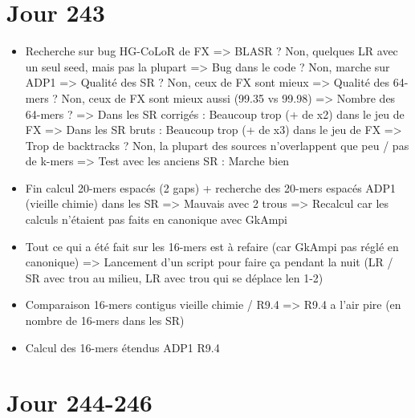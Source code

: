 \documentclass[12pt]{report}
\begin{document}
\section{Jour 243}

\begin{itemize}
	\item Recherche sur bug HG-CoLoR de FX
		  => BLASR ? Non, quelques LR avec un seul seed, mais pas la plupart
		  => Bug dans le code ? Non, marche sur ADP1
		  => Qualité des SR ? Non, ceux de FX sont mieux
		  => Qualité des 64-mers ? Non, ceux de FX sont mieux aussi (99.35 vs 99.98)
		  => Nombre des 64-mers ?
		  			=> Dans les SR corrigés : Beaucoup trop (+ de x2) dans le jeu de FX
		  			=> Dans les SR bruts : Beaucoup trop (+ de x3) dans le jeu de FX
		  => Trop de backtracks ? Non, la plupart des sources n'overlappent que peu / pas de k-mers
		  => Test avec les anciens SR : Marche bien
	
	\item Fin calcul 20-mers espacés (2 gaps) + recherche des 20-mers espacés ADP1 (vieille chimie) dans les SR
		  => Mauvais avec 2 trous
		  => Recalcul car les calculs n'étaient pas faits en canonique avec GkAmpi
		  
	\item Tout ce qui a été fait sur les 16-mers est à refaire (car GkAmpi pas réglé en canonique)
		  => Lancement d'un script pour faire ça pendant la nuit (LR / SR avec trou au milieu, LR avec trou qui se déplace len 1-2)	
		  
	\item Comparaison 16-mers contigus vieille chimie / R9.4 => R9.4 a l'air pire (en nombre de 16-mers dans les SR)
	
	\item Calcul des 16-mers étendus ADP1 R9.4
\end{itemize}

\section{Jour 244-246}
\end{document}
